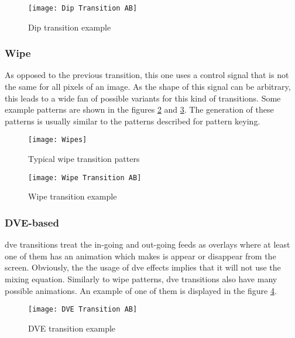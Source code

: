 \documentclass[../main.tex]{subfiles}
\begin{document}
\begin{figure}[htbp]
    \centering
    \texttt{[image: Dip Transition AB]}
    \caption{Dip transition example}
    \label{fig:dip_transition_example}
\end{figure}

\subsubsection{Wipe}
As opposed to the previous transition, this one uses a control signal that is not the same for all pixels of an image. As the shape of this signal can be arbitrary, this leads to a wide fan of possible variants for this kind of transitions. Some example patterns are shown in the figures \ref{fig:wipes} and \ref{fig:wipe_transition_example}. The generation of these patterns is usually similar to the patterns described for pattern keying.\newline

\begin{figure}[htbp]
    \centering
    \texttt{[image: Wipes]}
    \caption{Typical wipe transition patters}
    \label{fig:wipes}
\end{figure}

\begin{figure}[htbp]
    \centering
    \texttt{[image: Wipe Transition AB]}
    \caption{Wipe transition example}
    \label{fig:wipe_transition_example}
\end{figure}

\subsubsection{DVE-based}
\Gls{dve} transitions treat the in-going and out-going feeds as overlays where at least one of them has an animation which makes is appear or disappear from the screen. Obviously, the the usage of \gls{dve} effects implies that it will not use the mixing equation. Similarly to wipe patterns, \gls{dve} transitions also have many possible animations. An example of one of them is displayed in the figure \ref{fig:dve_transition_example}.\newline

\begin{figure}[htbp]
    \centering
    \texttt{[image: DVE Transition AB]}
    \caption{DVE transition example}
    \label{fig:dve_transition_example}
\end{figure}
\end{document}
